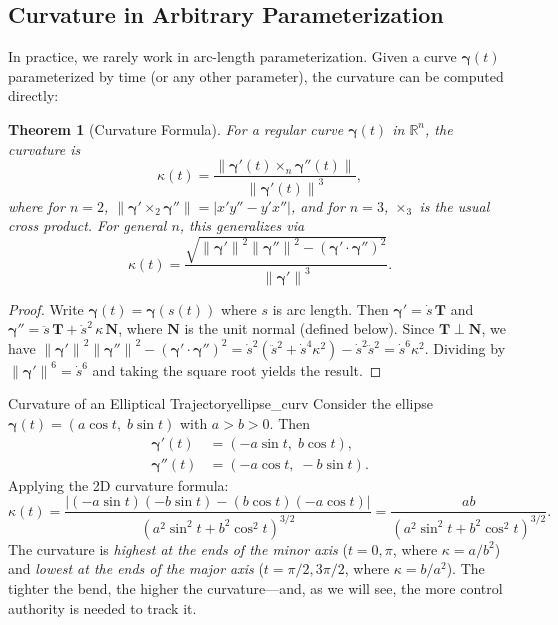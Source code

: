\documentclass[12pt, openany]{book}
\theoremstyle{plain}
\newtheorem{theorem}{Theorem}[chapter]
\newcommand{\traj}{\bm{\gamma}}
\newcommand{\Reals}{\mathbb{R}}
\newcommand{\norm}[1]{\left\lVert #1 \right\rVert}
\newcommand{\tangent}{\bm{T}}
\newcommand{\normal}{\bm{N}}
\begin{document}
\subsection{Curvature in Arbitrary Parameterization}

In practice, we rarely work in arc-length parameterization. Given a curve
$\traj(t)$ parameterized by time (or any other parameter), the curvature can
be computed directly:

\begin{theorem}[Curvature Formula]\label{thm:curvature_formula}
  For a regular curve $\traj(t)$ in $\Reals^n$, the curvature is
  \begin{equation}\label{eq:curvature_general}
    \kappa(t) = \frac{\norm{\traj'(t) \times_n \traj''(t)}}{\norm{\traj'(t)}^3},
  \end{equation}
  where for $n = 2$, $\norm{\traj' \times_2 \traj''} = |x'y'' - y'x''|$,
  and for $n = 3$, $\times_3$ is the usual cross product. For general $n$,
  this generalizes via
  \begin{equation}\label{eq:curvature_general_n}
    \kappa(t) = \frac{\sqrt{\norm{\traj'}^2 \norm{\traj''}^2
    - (\traj' \cdot \traj'')^2}}{\norm{\traj'}^3}.
  \end{equation}
\end{theorem}

\begin{proof}
  Write $\traj(t) = \traj(s(t))$ where $s$ is arc length. Then
  $\traj' = \dot{s}\, \tangent$ and
  $\traj'' = \ddot{s}\, \tangent + \dot{s}^2\, \kappa\, \normal$,
  where $\normal$ is the unit normal (defined below). Since
  $\tangent \perp \normal$, we have
  $\norm{\traj'}^2\norm{\traj''}^2 - (\traj'\cdot\traj'')^2
  = \dot{s}^2(\ddot{s}^2 + \dot{s}^4\kappa^2) - \dot{s}^2\ddot{s}^2
  = \dot{s}^6\kappa^2$.
  Dividing by $\norm{\traj'}^6 = \dot{s}^6$ and taking the square root yields
  the result.
\end{proof}

\begin{example}{Curvature of an Elliptical Trajectory}{ellipse_curv}
  Consider the ellipse $\traj(t) = (a\cos t,\; b\sin t)$ with $a > b > 0$. Then
  \begin{align}
    \traj'(t) &= (-a\sin t,\; b\cos t), \\
    \traj''(t) &= (-a\cos t,\; -b\sin t).
  \end{align}
  Applying the 2D curvature formula:
  \begin{equation}
    \kappa(t) = \frac{|(-a\sin t)(-b\sin t) - (b\cos t)(-a\cos t)|}
    {(a^2\sin^2 t + b^2\cos^2 t)^{3/2}}
    = \frac{ab}{(a^2\sin^2 t + b^2\cos^2 t)^{3/2}}.
  \end{equation}
  The curvature is \emph{highest at the ends of the minor axis}
  ($t = 0, \pi$, where $\kappa = a/b^2$) and \emph{lowest at the ends of the
  major axis} ($t = \pi/2, 3\pi/2$, where $\kappa = b/a^2$). The tighter the
  bend, the higher the curvature---and, as we will see, the more control
  authority is needed to track it.
\end{example}
\end{document}
